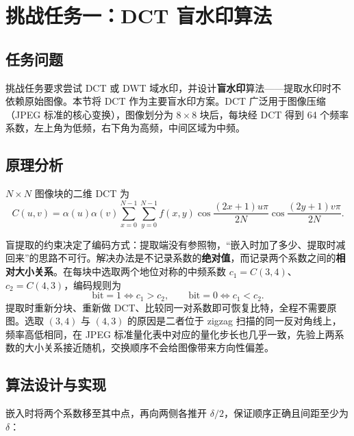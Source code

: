 \documentclass[11pt]{ctexart}
\begin{document}
\section{挑战任务一：DCT 盲水印算法}

\subsection{任务问题}

挑战任务要求尝试 DCT 或 DWT 域水印，并设计\textbf{盲水印}算法——提取水印时不依赖原始图像。本节将 DCT 作为主要盲水印方案。DCT 广泛用于图像压缩（JPEG 标准的核心变换），图像划分为 $8\times8$ 块后，每块经 DCT 得到 64 个频率系数，左上角为低频，右下角为高频，中间区域为中频。

\subsection{原理分析}

$N\times N$ 图像块的二维 DCT 为
\begin{equation}
  C(u,v) = \alpha(u)\alpha(v)\sum_{x=0}^{N-1}\sum_{y=0}^{N-1} f(x,y)
  \cos\frac{(2x+1)u\pi}{2N}\cos\frac{(2y+1)v\pi}{2N}.
  \label{eq:dct}
\end{equation}

盲提取的约束决定了编码方式：提取端没有参照物，“嵌入时加了多少、提取时减回来”的思路不可行。解决办法是不记录系数的\textbf{绝对值}，而记录两个系数之间的\textbf{相对大小关系}。在每块中选取两个地位对称的中频系数 $c_1 = C(3,4)$、$c_2 = C(4,3)$，编码规则为
\begin{equation}
  \text{bit} = 1 \Leftrightarrow c_1 > c_2, \qquad
  \text{bit} = 0 \Leftrightarrow c_1 < c_2.
  \label{eq:dct-rule}
\end{equation}
提取时重新分块、重新做 DCT、比较同一对系数即可恢复比特，全程不需要原图。选取 $(3,4)$ 与 $(4,3)$ 的原因是二者位于 zigzag 扫描的同一反对角线上，频率高低相同，在 JPEG 标准量化表中对应的量化步长也几乎一致，先验上两系数的大小关系接近随机，交换顺序不会给图像带来方向性偏差。

\subsection{算法设计与实现}

嵌入时将两个系数移至其中点，再向两侧各推开 $\delta/2$，保证顺序正确且间距至少为 $\delta$：
\end{document}
